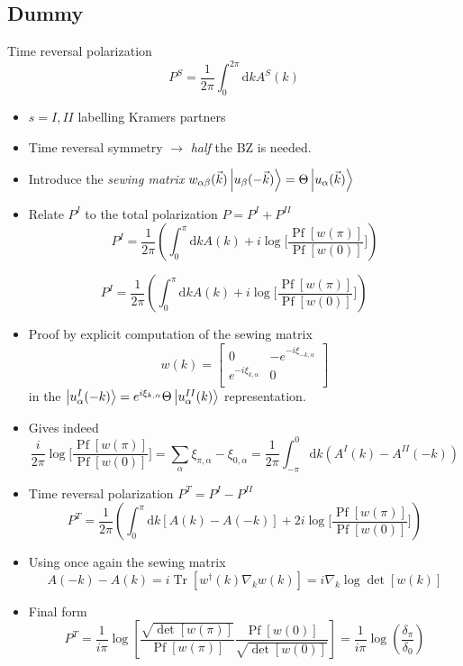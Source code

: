 \documentclass[xcolor=x11names,compress,professionalfonts]{beamer}
\renewcommand{\(}{\begin{columns}}
\renewcommand{\)}{\end{columns}}
\newcommand{\<}[1]{\begin{column}{#1}}
\renewcommand{\>}{\end{column}}
\renewcommand{\d}[1]{\mathrm{d}#1}
\DeclareMathOperator{\Pf}{Pf}
\DeclareMathOperator{\Tr}{Tr}
\begin{document}
\subsection{Dummy}
\begin{frame}[allowframebreaks]{Time reversal polarization}
    \[ P^S = \frac{1}{2\pi} \int_{0}^{2\pi} \d k A^S(k) \]
	\begin{itemize}
        \item $s = I, II$ labelling Kramers partners
		\item Time reversal symmetry $\rightarrow$ \textit{half} the BZ is needed.\\
		\item Introduce the \textit{sewing matrix} $w_{\alpha \beta}(\vec{k}) \Ket{u_\beta(-\vec{k})} = \Theta\Ket{u_\alpha(\vec{k})}$
		\item Relate $P^I$ to the total polarization $P = P^I + P^{II}$
			\[ P^I = \frac{1}{2 \pi} \left( \int_0^\pi\d k A(k) + i \log \bigg[ \frac{\Pf[w(\pi)]}{\Pf[w(0)]} \bigg] \right) \]
	\end{itemize}
	
	\framebreak
	
	\[ P^I = \frac{1}{2 \pi} \left( \int_0^\pi\d k A(k) + i \log \bigg[ \frac{\Pf[w(\pi)]}{\Pf[w(0)]} \bigg] \right) \]
	
	\begin{itemize}
		\item Proof by explicit computation of the sewing matrix
		\[ 
		w(k) = 
		\begin{bmatrix}
		0 & - e^{-i \xi_{-k,\alpha}}\\
		e^{-i \xi_{k,\alpha}} & 0\\
		\end{bmatrix} \]
		in the $\Ket{u_\alpha^I(-k)} = e^{i \xi_{k,\alpha}} \Theta \Ket{u^{II}_\alpha(k)}$ representation.
		
		\item Gives indeed \[ \frac{i}{2 \pi} \log \bigg[ \frac{\Pf[w(\pi)]}{\Pf[w(0)]} \bigg] =  \sum_{\alpha} \xi_{\pi,\alpha} - \xi_{0,\alpha} = \frac{1}{2\pi}\int_{-\pi}^0\d{k} \left( A^I(k) - A^{II}(-k) \right) \]
	\end{itemize}
	
	\framebreak
	
	\begin{itemize}
		\item Time reversal polarization $P^T = P^I - P^{II}$
		\[ P^T = \frac{1}{2 \pi} \left( \int_0^\pi\d k \left[ A(k)-A(-k) \right] + 2 i \log \bigg[ \frac{\Pf[w(\pi)]}{\Pf[w(0)]} \bigg] \right) \]
		\item Using once again the sewing matrix 
		\[ A(-k) - A(k) = i \Tr\left[ w^\dagger(k) \nabla_k w(k) \right] = i \nabla_k \log \det \left[ w(k) \right] \]
		\item Final form
		\[  P^T = \frac{1}{i\pi} \log \left[ \frac{\sqrt{\det[w(\pi)]}}{\Pf[w(\pi)]} \frac{\Pf[w(0)]}{\sqrt{\det[w(0)]}} \right]  =  \frac{1}{i\pi} \log \left( \frac{\delta_{\pi}}{\delta_{0}} \right) \]
	\end{itemize}
\end{frame}
\end{document}
